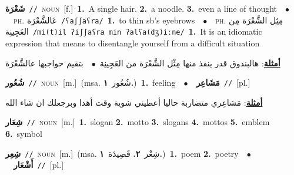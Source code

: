 \documentclass[10pt,a4paper,twoside]{article} %
\begin{document}
\begin{multicols}{2}
{\setlength\topsep{0pt}\textbf{\foreignlanguage{arabic}{شَعْرَة}}\ {\color{gray}\texttt{//}\color{black}}\ \textsc{noun}\ [f.]\ \textbf{1.}~A single hair.  \textbf{2.}~a noodle.  \textbf{3.}~even a line of thought\ \ $\bullet$\ \ \textsc{ph.} \color{gray} \foreignlanguage{arabic}{عَالشَّعْرَة}\color{black}\ {\color{gray}\texttt{/{\sffamily ʕaʃʃaʕra}/}\color{black}}\ \textbf{1.}~to thin sb's eyebrows\ \ $\bullet$\ \ \textsc{ph.} \color{gray} \foreignlanguage{arabic}{مِثِل الشَّعْرَة مِن العَجِينِة}\color{black}\ {\color{gray}\texttt{/{\sffamily mi(t)il ʔiʃʃaʕra min ʔalʕa(dʒ)iːne}/}\color{black}}\ \textbf{1.}~It is an idiomatic expression that means to disentangle yourself from a difficult situation\  \begin{flushright}\color{gray}\foreignlanguage{arabic}{\textbf{\underline{\foreignlanguage{arabic}{أمثلة}}}: هالبندوق قدر ينفذ منها مِثْل الشَّعْرَة من العَجِينِة\ $\bullet$\ \  بتقيم حواجبها عالشَّعْرَة}\end{flushright}\color{black}} \vspace{2mm}

{\setlength\topsep{0pt}\textbf{\foreignlanguage{arabic}{شُعُور}}\ {\color{gray}\texttt{//}\color{black}}\ \textsc{noun}\ [m.]\ \color{gray}(msa. \foreignlanguage{arabic}{شُعُور}~\foreignlanguage{arabic}{\textbf{١.}})\color{black}\ \textbf{1.}~feeling\ \ $\bullet$\ \ \setlength\topsep{0pt}\textbf{\foreignlanguage{arabic}{مَشَاعِر}}\ {\color{gray}\texttt{//}\color{black}}\ [pl.]\  \begin{flushright}\color{gray}\foreignlanguage{arabic}{\textbf{\underline{\foreignlanguage{arabic}{أمثلة}}}: مَشاعِري متضاربة حاليا أعطيني شوية وقت أهدا وبرجعلك ان شاء الله}\end{flushright}\color{black}} \vspace{2mm}

{\setlength\topsep{0pt}\textbf{\foreignlanguage{arabic}{شِعَار}}\ {\color{gray}\texttt{//}\color{black}}\ \textsc{noun}\ [m.]\ \textbf{1.}~slogan  \textbf{2.}~motto  \textbf{3.}~slogans  \textbf{4.}~mottos  \textbf{5.}~emblem  \textbf{6.}~symbol\ } \vspace{2mm}

{\setlength\topsep{0pt}\textbf{\foreignlanguage{arabic}{شِعِر}}\ {\color{gray}\texttt{//}\color{black}}\ \textsc{noun}\ [m.]\ \color{gray}(msa. \foreignlanguage{arabic}{شِعْر}~\foreignlanguage{arabic}{\textbf{٢.}}  \foreignlanguage{arabic}{قَصِيدَة}~\foreignlanguage{arabic}{\textbf{١.}})\color{black}\ \textbf{1.}~poem  \textbf{2.}~poetry\ \ $\bullet$\ \ \setlength\topsep{0pt}\textbf{\foreignlanguage{arabic}{أَشْعَار}}\ {\color{gray}\texttt{//}\color{black}}\ [pl.]\ } \vspace{2mm}


\end{multicols}
\end{document}
